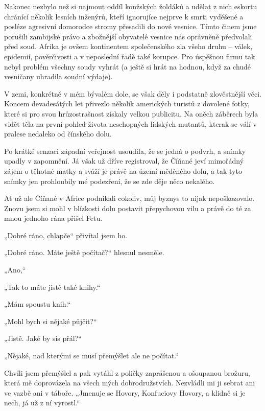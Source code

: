 Nakonec nezbylo než si najmout oddíl konžských žoldáků a udělat z nich eskortu chránící několik lesních inženýrů, kteří ignorujíce nejprve k smrti vyděšené a posléze agresivní domorodce stromy přesadili do nové vesnice. Tímto činem jsme porušili zambijské právo a zbožnější obyvatelé vesnice nás oprávněně předvolali před soud. Afrika je ovšem kontinentem společenského zla všeho druhu – válek, epidemií, pověrčivosti a v neposlední řadě také korupce. Pro úspěšnou firmu tak nebyl problém všechny soudy vyhrát (a ještě si hrát na hodnou, když za chudé vesničany uhradila soudní výdaje).

 V zemi, konkrétně v mém bývalém dole, se však děly i podstatně zlověstnější věci. Koncem devadesátých let přivezlo několik amerických turistů z dovolené fotky, které si pro svou hrůzostrašnost získaly velkou publicitu. Na oněch záběrech byla vidět těla na první pohled života neschopných lidských mutantů, kterak se válí v pralese nedaleko od čínského dolu.
 
Po krátké senzaci západní veřejnost usoudila, že se jedná o podvrh, a snímky upadly v zapomnění. Já však už dříve registroval, že Číňané jeví mimořádný zájem o těhotné matky a sváží je právě na území měděného dolu, a tak tyto snímky jen prohloubily mé podezření, že se zde děje něco nekalého.

Ať už ale Číňané v Africe podnikali cokoliv, můj byznys to nijak nepoškozovalo. Znovu jsem si mohl v blízkosti dolu postavit přepychovou vilu a právě do té za mnou jednoho rána přišel Fetu.

„Dobré ráno, chlapče“ přivítal jsem ho.
 
„Dobré ráno. Máte ještě počítač?“ hlesnul nesměle. 

 „Ano,“

„Tak to máte jistě také knihy.“

„Mám spoustu knih.“

„Mohl bych si nějaké půjčit?“

„Jistě. Jaké by sis přál?“

„Nějaké, nad kterými se musí přemýšlet ale ne počítat.“

Chvíli jsem přemýšlel a pak vytáhl z poličky zaprášenou a ošoupanou brožuru, která mě doprovázela na všech mých dobrodružstvích. Nezvládli mi ji sebrat ani ve vazbě ani v táboře. „Jmenuje se Hovory, Konfuciovy Hovory, a klidně si je nech, já už z ní vyrostl.“
